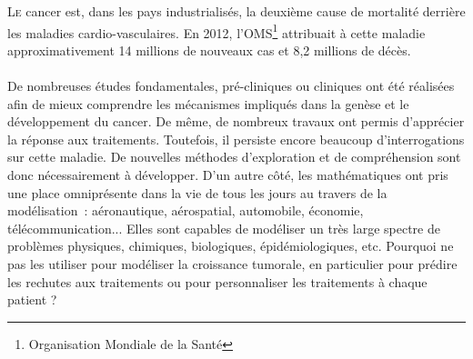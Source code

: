 \documentclass[main.tex]{subfiles}
\begin{document}

\lettrine{L}{e} cancer est, dans les pays industrialisés, la deuxième cause de mortalité derrière les maladies cardio-vasculaires. 
En 2012, l'OMS\footnote{Organisation Mondiale de la Santé} attribuait à cette maladie approximativement 14 millions de nouveaux cas et 8,2 millions de décès. 

\paragraph{}
De nombreuses études fondamentales, pré-cliniques ou cliniques ont été réalisées afin de mieux comprendre les mécanismes impliqués dans la genèse et le développement du cancer. De même, de nombreux travaux ont permis d'apprécier la réponse aux traitements. Toutefois, il persiste encore beaucoup d'interrogations sur cette maladie. De nouvelles méthodes d'exploration et de compréhension sont donc nécessairement à développer.
 D'un autre côté, les mathématiques ont pris une place omniprésente dans la vie de tous les jours au travers de la modélisation~: aéronautique, aérospatial, automobile, économie, télécommunication... Elles sont capables de modéliser un très large spectre de problèmes physiques, chimiques, biologiques, épidémiologiques, etc. Pourquoi ne pas les utiliser pour modéliser la croissance tumorale, en particulier pour prédire les rechutes aux traitements ou pour personnaliser les traitements à chaque patient ? 
 
\end{document}

